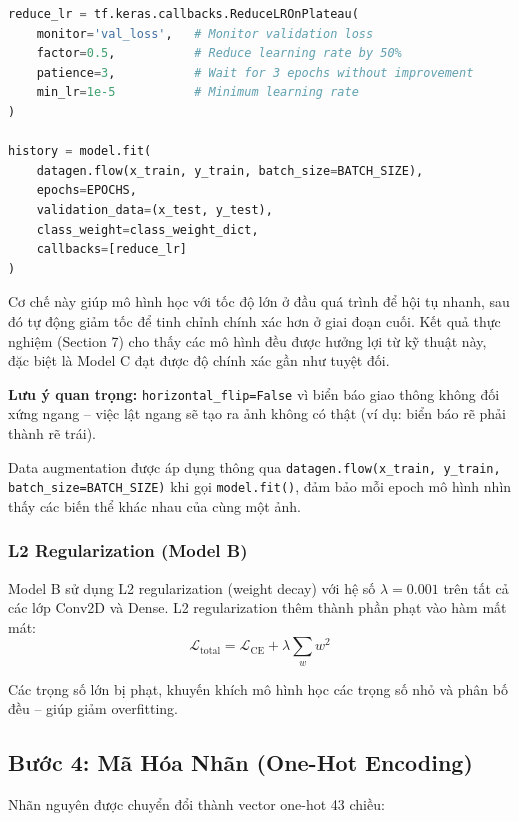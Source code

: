 \documentclass[12pt,a4paper]{article}
\begin{document}
\begin{lstlisting}[language=Python, caption={ReduceLROnPlateau configuration.}, label={lst:reduce_lr}]
reduce_lr = tf.keras.callbacks.ReduceLROnPlateau(
    monitor='val_loss',   # Monitor validation loss
    factor=0.5,           # Reduce learning rate by 50%
    patience=3,           # Wait for 3 epochs without improvement
    min_lr=1e-5           # Minimum learning rate
)

history = model.fit(
    datagen.flow(x_train, y_train, batch_size=BATCH_SIZE),
    epochs=EPOCHS,
    validation_data=(x_test, y_test),
    class_weight=class_weight_dict,
    callbacks=[reduce_lr]
)
\end{lstlisting}

Cơ chế này giúp mô hình học với tốc độ lớn ở đầu quá trình để hội tụ nhanh, sau đó tự động giảm tốc để tinh chỉnh chính xác hơn ở giai đoạn cuối. Kết quả thực nghiệm (Section 7) cho thấy các mô hình đều được hưởng lợi từ kỹ thuật này, đặc biệt là Model C đạt được độ chính xác gần như tuyệt đối.

\textbf{Lưu ý quan trọng:} \texttt{horizontal\_flip=False} vì biển báo giao thông không đối xứng ngang -- việc lật ngang sẽ tạo ra ảnh không có thật (ví dụ: biển báo rẽ phải thành rẽ trái).

Data augmentation được áp dụng thông qua \texttt{datagen.flow(x\_train, y\_train, batch\_size=BATCH\_SIZE)} khi gọi \texttt{model.fit()}, đảm bảo mỗi epoch mô hình nhìn thấy các biến thể khác nhau của cùng một ảnh.

\subsubsection*{L2 Regularization (Model B)}
Model B sử dụng L2 regularization (weight decay) với hệ số $\lambda=0.001$ trên tất cả các lớp Conv2D và Dense. L2 regularization thêm thành phần phạt vào hàm mất mát:
\begin{equation}
    \mathcal{L}_{\text{total}} = \mathcal{L}_{\text{CE}} + \lambda \sum_{w} w^2
\end{equation}

Các trọng số lớn bị phạt, khuyến khích mô hình học các trọng số nhỏ và phân bố đều -- giúp giảm overfitting.

\subsection{Bước 4: Mã Hóa Nhãn (One-Hot Encoding)}

Nhãn nguyên được chuyển đổi thành vector one-hot 43 chiều:
\end{document}
